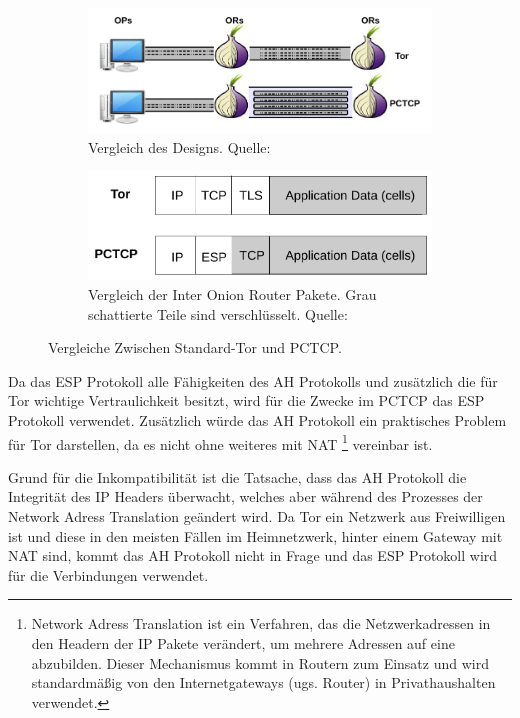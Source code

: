 \documentclass[fleqn,envcountsame,runningheads,10pt,a4paper]{llncs}
\begin{document}
\begin{figure}[h]
  \begin{center}
    \begin{subfigure}[t]{0.46\textwidth}
      \includegraphics[width=\textwidth]{pics/PCTCP_design.pdf}
      \caption{Vergleich des Designs. Quelle: \cite{pctcp}}
      \label{fig:pctcpdesign}
    \end{subfigure}
    \begin{subfigure}[t]{0.46\textwidth}
      \includegraphics[width=\textwidth]{pics/PCTCP_header.pdf}
      \caption{Vergleich der Inter Onion Router Pakete. Grau schattierte Teile sind verschlüsselt. Quelle:\cite{pctcp}}
      \label{fig:pctcpheader}
    \end{subfigure}
    \caption{Vergleiche Zwischen Standard-Tor und PCTCP.}
  \end{center} 
\end{figure}

Da das ESP Protokoll alle Fähigkeiten des AH Protokolls und zusätzlich die für 
Tor wichtige Vertraulichkeit besitzt, wird für die Zwecke im PCTCP das ESP 
Protokoll verwendet. Zusätzlich würde das AH Protokoll ein praktisches Problem 
für Tor darstellen, da es nicht ohne weiteres mit NAT \footnote{Network Adress 
Translation \cite{rfc:nat} ist ein Verfahren, das die Netzwerkadressen in den  
Headern der IP Pakete verändert, um mehrere Adressen auf eine abzubilden. Dieser 
Mechanismus kommt in Routern zum Einsatz und wird standardmäßig von den 
Internetgateways (ugs. Router) in Privathaushalten verwendet.}  vereinbar ist. 

Grund für die Inkompatibilität ist die Tatsache, dass das AH Protokoll die 
Integrität des IP Headers überwacht, welches aber während des Prozesses der 
Network Adress Translation geändert wird. Da Tor ein Netzwerk aus Freiwilligen 
ist und diese in den meisten Fällen im Heimnetzwerk, hinter einem Gateway mit 
NAT sind, kommt das AH Protokoll nicht in Frage und das ESP Protokoll wird für 
die Verbindungen verwendet.
\end{document}
